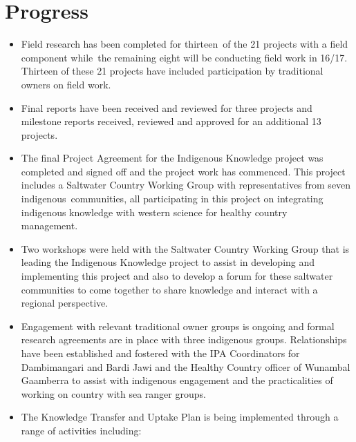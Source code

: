 \documentclass[version=last,
    paper=a4, %
    10pt, %
    usenames,
    dvipsnames,
    oneside, %
    headings=openany, %
    DIV=15 %
]{scrbook}
\begin{document}
\section*{Progress}
\begin{itemize}
\itemsep1pt\parskip0pt
\item
  Field research has been completed for thirteen~of the 21 projects with
  a field component while~the remaining eight will be conducting field
  work in 16/17. Thirteen of these 21 projects have included
  participation by traditional owners on field work.~
\item
  Final reports have been received and reviewed for three projects and
  milestone reports received, reviewed and approved for an additional 13
  projects.~
\item
  The final Project Agreement for the Indigenous Knowledge project was
  completed and signed off and the project work has commenced. This
  project includes a Saltwater Country Working Group with
  representatives from seven indigenous~communities, all participating
  in this project on integrating indigenous knowledge with western
  science for healthy country management.~~
\item
  Two workshops were held with the Saltwater Country Working Group that
  is leading the Indigenous Knowledge project to assist in developing
  and implementing this project and also to develop a forum for these
  saltwater communities to come together to share knowledge and interact
  with a regional perspective.~
\item
  Engagement with relevant traditional owner groups is ongoing and
  formal research agreements are in place with three indigenous groups.
  Relationships have been established and fostered with the IPA
  Coordinators for Dambimangari and Bardi Jawi and the Healthy Country
  officer of Wunambal Gaamberra to assist with indigenous engagement and
  the practicalities of working on country with sea ranger groups.
\item
  The Knowledge Transfer and Uptake Plan is being implemented through a
  range of activities including:


\end{itemize}
\end{document}
